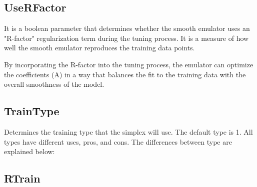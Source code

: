 \documentclass[12pt]{article}
\numberwithin{equation}{section}
\numberwithin{figure}{section}
\begin{document}
\subsection{UseRFactor}
It is a boolean parameter that determines whether the smooth emulator uses an "R-factor" regularization term during the tuning process. It is a measure of how well the smooth emulator reproduces the training data points.

By incorporating the R-factor into the tuning process, the emulator can optimize the coefficients (A) in a way that balances the fit to the training data with the overall smoothness of the model.

\subsection{TrainType}
  Determines the training type that the simplex will use. The default type is 1. All types have different uses, pros, and cons. The differences between type are explained below:

  

\subsection{RTrain}
\end{document}
